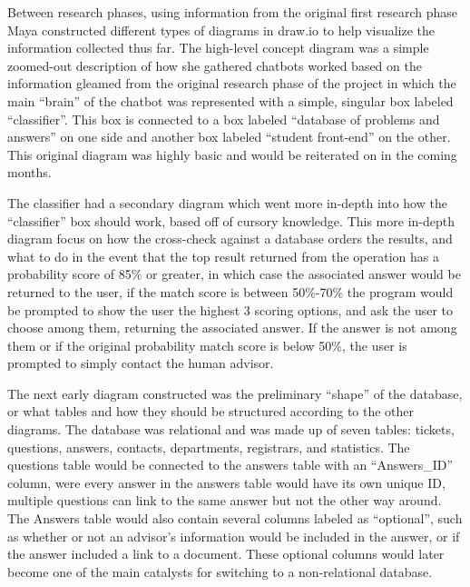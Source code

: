 \documentclass[titlepage, 12pt]{article}
\begin{document}
Between research phases, using information from the original first research phase Maya constructed different types of diagrams in draw.io to help visualize the information collected thus far. The high-level concept diagram was a simple zoomed-out description of how she gathered chatbots worked based on the information gleamed from the original research phase of the project in which the main “brain” of the chatbot was represented with a simple, singular box labeled “classifier”. This box is connected to a box labeled “database of problems and answers” on one side and another box labeled “student front-end” on the other. This original diagram was highly basic and would be reiterated on in the coming months. 

The classifier had a secondary diagram which went more in-depth into how the “classifier” box should work, based off of cursory knowledge. This more in-depth diagram focus on how the cross-check against a database orders the results, and what to do in the event that the top result returned from the operation has a probability score of 85\% or greater, in which case the associated answer would be returned to the user, if the match score is between 50\%-70\% the program would be prompted to show the user the highest 3 scoring options, and ask the user to choose among them, returning the associated answer. If the answer is not among them or if the original probability match score is below 50\%, the user is prompted to simply contact the human advisor. 

The next early diagram constructed was the preliminary “shape” of the database, or what tables and how they should be structured according to the other diagrams. The database was relational and was made up of seven tables: tickets, questions, answers, contacts, departments, registrars, and statistics. The questions table would be connected to the answers table with an “Answers\_ID” column, were every answer in the answers table would have its own unique ID, multiple questions can link to the same answer but not the other way around. The Answers table would also contain several columns labeled as “optional”, such as whether or not an advisor’s information would be included in the answer, or if the answer included a link to a document. These optional columns would later become one of the main catalysts for switching to a non-relational database.
\end{document}
